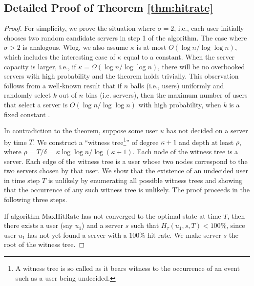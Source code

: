 \documentclass[conference]{IEEEtran}
\newcommand{\comment}[1]{}
\begin{document}


\balance
\newpage
\appendix

\subsection{Detailed Proof of Theorem \ref{thm:hitrate}}
\begin{proof}
For simplicity, we prove the situation where $\sigma = 2$, i.e., each user initially chooses two random candidate servers in step 1 of the algorithm. The case where $\sigma > 2$ is analogous. 
\comment{Further we will assume that a user $u$ requesting application from an overbooked server $s$  at time $t$,  $0 \leq t \leq T$, has $H_\tau(i,j,t) <100\%$,  as the probability that this assumption is violated at most $1/ n^{\Omega(1)}$ as per Lemma~\ref{lem:overbookhit}.}  Wlog, we also assume  $\kappa$ is at most $O(\log n/ \log\log n)$, which includes the interesting case of  $\kappa$ equal to a constant.  When the server capacity is larger, i.e., if  $\kappa = \Omega(\log n/ \log\log n)$,  there will be no overbooked servers with high probability and the theorem holds trivially. This observation follows from a well-known result that if $n$ balls (i.e., users)  uniformly and randomly select $k$  out of $n$ bins (i.e. servers), then the maximum number of users that select a server is $O(\log n / \log\log n)$ with high probability, when  $k$ is a fixed constant \cite{raab1998balls}. 

In contradiction to the theorem, suppose some user $u$ has not decided on a server  by time $T$. We construct a ``witness tree\footnote{A witness tree is so called as it bears witness to the occurrence of an event such as  a user being undecided.}''  of degree $\kappa + 1$ and depth at least $\rho$, where  $\rho = T/\delta =  \kappa \log\log n/\log (\kappa + 1)$. Each node of the witness tree is a server. Each edge of the witness tree is a user whose two nodes correspond to the two servers chosen by that user.  We show that the existence of an undecided user in time step $T$ is unlikely by enumerating all possible witness trees and showing that the occurrence of any such  witness tree is unlikely.  The proof proceeds in the following three steps.

  If algorithm $\mathrm{MaxHitRate}$ has not converged to the optimal state at time $T$, then there exists a user (say $u_1$)  and a server $s$ such that $H_\tau(u_1, s, T) < 100\%$, since user $u_1$ has not yet found a server with a $100\%$ hit rate. We make server $s$ the root of the witness tree.



\end{proof}
\end{document}
